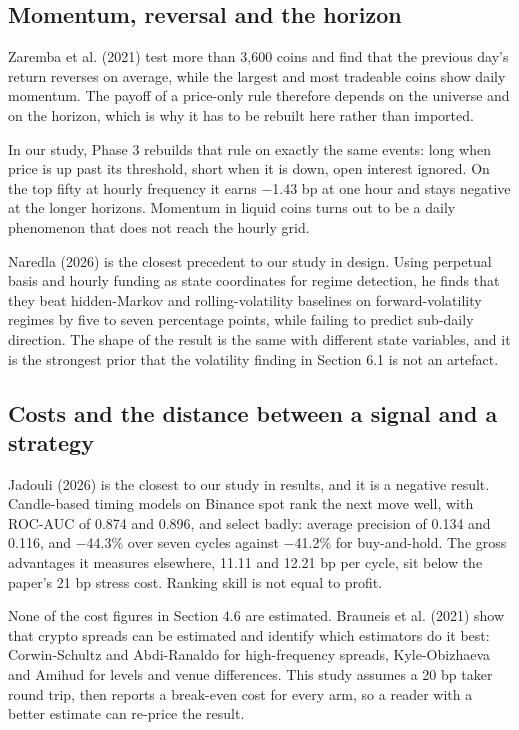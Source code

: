 \documentclass[11pt,a4paper]{article}
\begin{document}
\subsection{Momentum, reversal and the horizon}

Zaremba et al. (2021) test more than 3,600 coins and find that the previous day's return reverses on average, while the largest and most tradeable coins show daily momentum. The payoff of a price-only rule therefore depends on the universe and on the horizon, which is why it has to be rebuilt here rather than imported.

In our study, Phase 3 rebuilds that rule on exactly the same events: long when price is up past its threshold, short when it is down, open interest ignored. On the top fifty at hourly frequency it earns $-$1.43 bp at one hour and stays negative at the longer horizons. Momentum in liquid coins turns out to be a daily phenomenon that does not reach the hourly grid.

Naredla (2026) is the closest precedent to our study in design. Using perpetual basis and hourly funding as state coordinates for regime detection, he finds that they beat hidden-Markov and rolling-volatility baselines on forward-volatility regimes by five to seven percentage points, while failing to predict sub-daily direction. The shape of the result is the same with different state variables, and it is the strongest prior that the volatility finding in Section 6.1 is not an artefact.

\subsection{Costs and the distance between a signal and a strategy}

Jadouli (2026) is the closest to our study in results, and it is a negative result. Candle-based timing models on Binance spot rank the next move well, with ROC-AUC of 0.874 and 0.896, and select badly: average precision of 0.134 and 0.116, and $-$44.3\% over seven cycles against $-$41.2\% for buy-and-hold. The gross advantages it measures elsewhere, 11.11 and 12.21 bp per cycle, sit below the paper's 21 bp stress cost. Ranking skill is not equal to profit.

None of the cost figures in Section 4.6 are estimated. Brauneis et al. (2021) show that crypto spreads can be estimated and identify which estimators do it best: Corwin-Schultz and Abdi-Ranaldo for high-frequency spreads, Kyle-Obizhaeva and Amihud for levels and venue differences. This study assumes a 20 bp taker round trip, then reports a break-even cost for every arm, so a reader with a better estimate can re-price the result.
\end{document}
